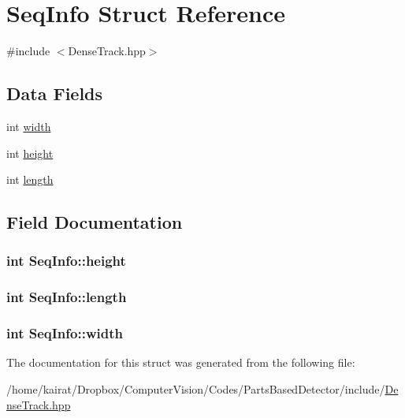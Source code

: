 \hypertarget{structSeqInfo}{}\section{Seq\+Info Struct Reference}
\label{structSeqInfo}


{\ttfamily \#include $<$Dense\+Track.\+hpp$>$}

\subsection*{Data Fields}
\begin{DoxyCompactItemize}
\item 
int \hyperlink{structSeqInfo_ae3d024112ee275903efb7ecb70ea2831}{width}
\item 
int \hyperlink{structSeqInfo_a2ce027dc9f7aacb28172d1690bd69141}{height}
\item 
int \hyperlink{structSeqInfo_a973a3f52953df01164736f3fed142180}{length}
\end{DoxyCompactItemize}


\subsection{Field Documentation}
\hypertarget{structSeqInfo_a2ce027dc9f7aacb28172d1690bd69141}{}
\subsubsection[{height}]{\setlength{\rightskip}{0pt plus 5cm}int Seq\+Info\+::height}\label{structSeqInfo_a2ce027dc9f7aacb28172d1690bd69141}
\hypertarget{structSeqInfo_a973a3f52953df01164736f3fed142180}{}
\subsubsection[{length}]{\setlength{\rightskip}{0pt plus 5cm}int Seq\+Info\+::length}\label{structSeqInfo_a973a3f52953df01164736f3fed142180}
\hypertarget{structSeqInfo_ae3d024112ee275903efb7ecb70ea2831}{}
\subsubsection[{width}]{\setlength{\rightskip}{0pt plus 5cm}int Seq\+Info\+::width}\label{structSeqInfo_ae3d024112ee275903efb7ecb70ea2831}


The documentation for this struct was generated from the following file\+:\begin{DoxyCompactItemize}
\item 
/home/kairat/\+Dropbox/\+Computer\+Vision/\+Codes/\+Parts\+Based\+Detector/include/\hyperlink{DenseTrack_8hpp}{Dense\+Track.\+hpp}\end{DoxyCompactItemize}
